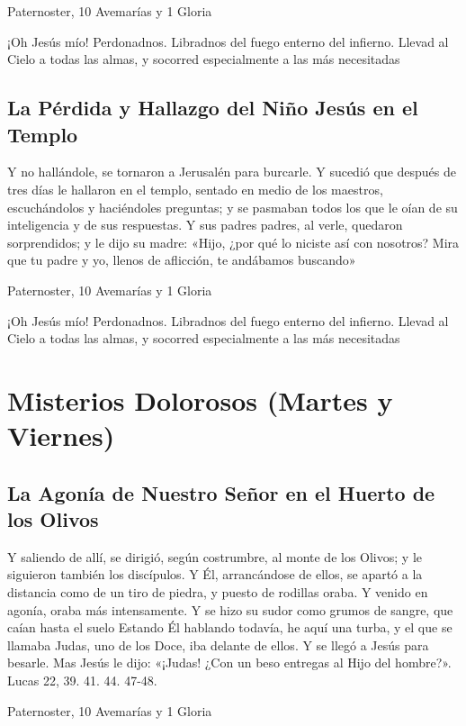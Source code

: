 \documentclass[a4paper,11pt, oneside]{report}
\begin{document}
       Paternoster, 10 Avemarías y 1 Gloria
      
      \medskip
      ¡Oh Jesús mío! Perdonadnos. Libradnos del fuego enterno del infierno. Llevad al Cielo a todas las almas, y socorred especialmente a las más 
      necesitadas
            
    \subsection*{La Pérdida y Hallazgo del Niño Jesús en el Templo}
      Y no hallándole, se tornaron a Jerusalén para burcarle. Y sucedió que después de tres días le hallaron en el templo, sentado en medio de los maestros,
      escuchándolos y haciéndoles preguntas; y se pasmaban todos los que le oían de su inteligencia y de sus respuestas. Y sus padres padres, al verle, quedaron
      sorprendidos; y le dijo su madre: «Hijo, ¿por qué lo niciste así con nosotros? Mira que tu padre y yo, llenos de aflicción, te andábamos buscando»
      
       Paternoster, 10 Avemarías y 1 Gloria
      
      \medskip
      ¡Oh Jesús mío! Perdonadnos. Libradnos del fuego enterno del infierno. Llevad al Cielo a todas las almas, y socorred especialmente a las más 
      necesitadas

  \section*{Misterios Dolorosos (Martes y Viernes)}
    
    \subsection*{La Agonía de Nuestro Señor en el Huerto de los Olivos}
      Y saliendo de allí, se dirigió, según costrumbre, al monte de los Olivos; y le siguieron también los discípulos.
      Y Él, arrancándose de ellos, se apartó a la distancia como de un tiro de piedra, y puesto de rodillas oraba. 
      Y venido en agonía, oraba más intensamente. Y se hizo su sudor como grumos de sangre, que caían hasta el suelo
      Estando Él hablando todavía, he aquí una turba, y el que se llamaba Judas, uno de los Doce, iba delante de ellos. Y se llegó a Jesús para besarle.
      Mas Jesús le dijo: «¡Judas! ¿Con un beso entregas al Hijo del hombre?». Lucas 22, 39. 41. 44. 47-48.

       Paternoster, 10 Avemarías y 1 Gloria
      
\end{document}
